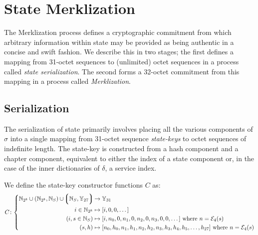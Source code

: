 \section{State Merklization}\label{sec:statemerklization}

The Merklization process defines a cryptographic commitment from which arbitrary information within state may be provided as being authentic in a concise and swift fashion. We describe this in two stages; the first defines a mapping from 31-octet sequences to (unlimited) octet sequences in a process called \emph{state serialization}. The second forms a 32-octet commitment from this mapping in a process called \emph{Merklization}.

\subsection{Serialization}

The serialization of state primarily involves placing all the various components of $\sigma$ into a single mapping from 31-octet sequence \emph{state-keys} to octet sequences of indefinite length. The state-key is constructed from a hash component and a chapter component, equivalent to either the index of a state component or, in the case of the inner dictionaries of $\delta$, a service index.

We define the state-key constructor functions $C$ as:
\begin{equation}
  C\colon\left\{\begin{aligned}
    \N_{2^8} \cup (\N_{2^8}, \N_S) \cup \tup{\N_S, \Y_{27}} &\to \Y_{31} \\
    i \in \N_{2^8} &\mapsto [i, 0, 0, \dots] \\
    (i, s \in \N_S) &\mapsto [i, n_0, 0, n_1, 0, n_2, 0, n_3, 0, 0, \dots]\ \where n = \se_4(s) \\
    (s, h) &\mapsto [n_0, h_0, n_1, h_1, n_2, h_2, n_3, h_3, h_4, h_5, \dots, h_{27}]\ \where n = \se_4(s)
  \end{aligned}
  \right.
\end{equation}

